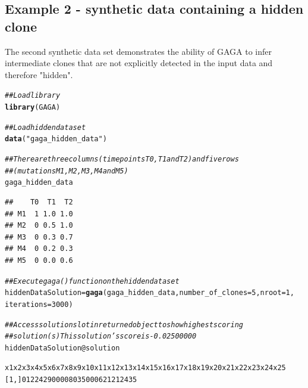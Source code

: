 \documentclass[a4paper]{article}\usepackage[]{graphicx}\usepackage[]{color}
\makeatletter
\newcommand{\hlnum}[1]{\textcolor[rgb]{0.686,0.059,0.569}{#1}}%
\newcommand{\hlstr}[1]{\textcolor[rgb]{0.192,0.494,0.8}{#1}}%
\newcommand{\hlcom}[1]{\textcolor[rgb]{0.678,0.584,0.686}{\textit{#1}}}%
\newcommand{\hlopt}[1]{\textcolor[rgb]{0,0,0}{#1}}%
\newcommand{\hlstd}[1]{\textcolor[rgb]{0.345,0.345,0.345}{#1}}%
\newcommand{\hlkwb}[1]{\textcolor[rgb]{0.69,0.353,0.396}{#1}}%
\newcommand{\hlkwc}[1]{\textcolor[rgb]{0.333,0.667,0.333}{#1}}%
\newcommand{\hlkwd}[1]{\textcolor[rgb]{0.737,0.353,0.396}{\textbf{#1}}}%
\newenvironment{kframe}{%
 \def\at@end@of@kframe{}%
 \ifinner\ifhmode%
  \def\at@end@of@kframe{\end{minipage}}%
  \begin{minipage}{\columnwidth}%
 \fi\fi%
 \def\FrameCommand##1{\hskip\@totalleftmargin \hskip-\fboxsep
 \colorbox{shadecolor}{##1}\hskip-\fboxsep
     \hskip-\linewidth \hskip-\@totalleftmargin \hskip\columnwidth}%
 \MakeFramed {\advance\hsize-\width
   \@totalleftmargin\z@ \linewidth\hsize
   \@setminipage}}%
 {\par\unskip\endMakeFramed%
 \at@end@of@kframe}
\newenvironment{knitrout}{}{} %
\makeatother
\begin{document}
\subsection{Example 2 - synthetic data containing a hidden clone}
The second synthetic data set demonstrates the ability of GAGA to infer intermediate clones that are not explicitly detected in the input data and therefore "hidden".

\begin{knitrout}
\color{fgcolor}\begin{kframe}
\begin{alltt}
\hlcom{## Load library}
\hlkwd{library}\hlstd{(GAGA)}

\hlcom{## Load hidden data set}
\hlkwd{data}\hlstd{(}\hlstr{"gaga_hidden_data"}\hlstd{)}

\hlcom{## There are three columns (time points T0, T1 and T2) and five rows}
\hlcom{## (mutations M1, M2, M3, M4 and M5)}
\hlstd{gaga_hidden_data}
\end{alltt}
\begin{verbatim}
##    T0  T1  T2
## M1  1 1.0 1.0
## M2  0 0.5 1.0
## M3  0 0.3 0.7
## M4  0 0.2 0.3
## M5  0 0.0 0.6
\end{verbatim}
\end{kframe}
\end{knitrout}


\begin{knitrout}
\color{fgcolor}\begin{kframe}
\begin{alltt}
\hlcom{## Execute gaga() function on the hidden data set}
\hlstd{hiddenDataSolution} \hlkwb{=} \hlkwd{gaga}\hlstd{(gaga_hidden_data,} \hlkwc{number_of_clones} \hlstd{=} \hlnum{5}\hlstd{,} \hlkwc{nroot} \hlstd{=} \hlnum{1}\hlstd{,}
    \hlkwc{iterations} \hlstd{=} \hlnum{3000}\hlstd{)}

\hlcom{## Access solution slot in returned object to show highest scoring}
\hlcom{## solution(s) This solution's score is -0.02500000}
\hlstd{hiddenDataSolution}\hlopt{@}\hlkwc{solution}
\end{alltt}
\end{kframe}
\end{knitrout}

\begin{alltt}
     x1 x2 x3 x4 x5 x6 x7 x8 x9 x10 x11 x12 x13 x14 x15 x16 x17 x18 x19 x20 x21 x22 x23 x24 x25
[1,]  0  1  2  2  4 29  0  0  0   0   8   0   3   5   0   0   0   6   2  12   1   2   4   3   5
\end{alltt}
\end{document}
